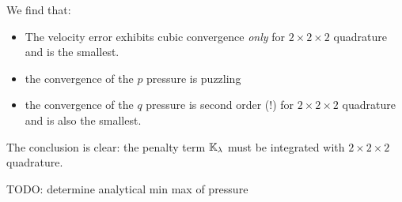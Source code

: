We find that:
\begin{itemize}
\item The velocity error exhibits cubic convergence {\it only} 
for $2\times 2\times 2$ quadrature and is the smallest.
\item the convergence of the $p$ pressure is puzzling
\item the convergence of the $q$ pressure is second order (!) for 
$2\times 2\times 2$ quadrature and is also the smallest.   
\end{itemize}

The conclusion is clear: {\color{violet}the penalty term ${\mathbb{K}}_\lambda$ 
must be integrated with $2\times 2\times 2$ quadrature}.

TODO: determine analytical min max of pressure

